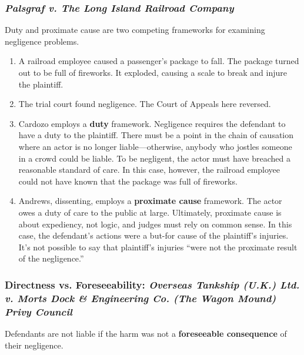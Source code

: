 \subsubsection{\emph{Palsgraf v. The Long Island Railroad Company}}

Duty and proximate cause are two competing frameworks for examining negligence 
problems.

\begin{enumerate}
    \item A railroad employee caused a passenger's package to fall. The 
    package turned out to be full of fireworks. It exploded, causing a scale 
    to break and injure the plaintiff.
    \item The trial court found negligence. The Court of Appeals here 
    reversed.
    \item Cardozo employs a \textbf{duty} framework. Negligence requires the 
    defendant to have a duty to the plaintiff. There must be a point in the 
    chain of causation where an actor is no longer liable---otherwise, anybody 
    who jostles someone in a crowd could be liable. To be negligent, the actor 
    must have breached a reasonable standard of care. In this case, however, 
    the railroad employee could not have known that the package was full of 
    fireworks.
    \item Andrews, dissenting, employs a \textbf{proximate cause} framework. 
    The actor owes a duty of care to the public at large. Ultimately, 
    proximate cause is about expediency, not logic, and judges must rely on 
    common sense. In this case, the defendant's actions were a but-for cause 
    of the plaintiff's injuries. It's not possible to say that plaintiff's 
    injuries ``were not the proximate result of the negligence.''
\end{enumerate}

\subsubsection{Directness vs. Foreseeability: \emph{Overseas Tankship (U.K.) 
Ltd. v. Morts Dock \& Engineering Co. (The Wagon Mound) Privy Council}}

Defendants are not liable if the harm was not a \textbf{foreseeable 
consequence} of their negligence.

